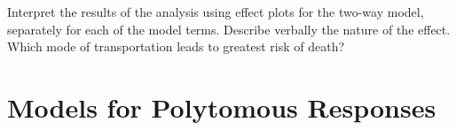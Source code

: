 \documentclass[10pt]{report}\usepackage[]{graphicx}\usepackage[]{color}
\begin{document}
\begin{Exercises}
\begin{enumerate*}
    \item Interpret the results of the analysis using effect plots for the two-way model, separately for each of
    the model terms. Describe verbally the nature of the  effect. 
    Which mode of transportation leads to greatest risk of death?
    \begin{ans}
    \end{ans}
    
  \end{enumerate*}

%   

\end{Exercises}


\chapter[Models for Polytomous Responses]{Models for Polytomous \mbox{Responses}}\label{ch:polytomous}
\end{document}

